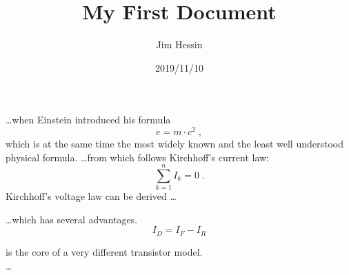 \documentclass[a4paper]{slides}
\title{My First Document}
\date{2019/11/10}
\author{Jim Hessin}
\begin{document}
\ldots when Einstein introduced his formula
\begin{equation}
e = m \cdot c^2 \; ,
\end{equation}
which is at the same time the most widely known
and the least well understood physical formula.
\ldots from which follows Kirchhoff's current law:
\begin{equation}
\sum_{k=1}^{n} I_k = 0 \; .
\end{equation}
Kirchhoff's voltage law can be derived \ldots

\ldots which has several advantages.
\begin{equation}
I_D = I_F - I_R
\end{equation}

is the core of a very different transistor model.\\
\ldots
%
%
%
%
%
%
%
%
%
%
%
%
\end{document}

